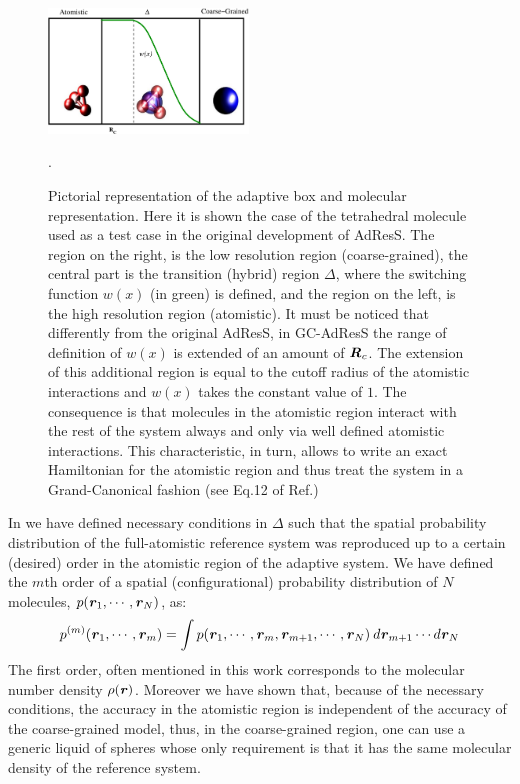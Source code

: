 \documentclass[a4paper,preprint,unsortedaddress]{revtex4-1}
\newcommand{\recheck}[1]{{\color{red} #1}}
\newcommand{\vect}[1]{\textbf{\textit{#1}}}
\begin{document}
\begin{figure}
\center
\includegraphics[width=0.475\textwidth]{adapt-schem.eps}
\caption{Pictorial representation of the adaptive box and
molecular representation. Here it is shown the case of the tetrahedral molecule used as a test case in the original development of AdResS. The region on the right,
is the low resolution region (coarse-grained), the central part is
the transition (hybrid) region $\Delta$, where the switching function
$w(x)$ (in green) is defined, and the region on the left, is the high resolution region (atomistic). It must be noticed that differently from the original AdResS, in GC-AdResS the range of definition of $w(x)$ is extended of an amount of ${\vect R}_{c}$. The extension of this additional region is equal to the cutoff radius of the atomistic interactions and $w(x)$ takes the constant value of $1$. The consequence is that molecules in the atomistic region interact with the rest of the system always and only via well defined atomistic interactions. This characteristic, in turn, allows to write an exact Hamiltonian for the atomistic region and thus treat the system in a Grand-Canonical fashion \recheck{(see Eq.12 of Ref.\cite{prx})}}.
\label{fig1}
\end{figure} 
In \cite{prx} we have defined necessary conditions in $\Delta$ such that the spatial probability distribution of the full-atomistic reference system was reproduced up to a certain (desired) order in the atomistic region of the adaptive system. \recheck{We have defined the $m$th order of a spatial (configurational) probability distribution of $N$ molecules, $p({\vect r}_{1}, \cdots, {\vect r}_{N})$, as:
\begin{equation}
p^{(m)}({\vect r}_{1}, \cdots, {\vect r}_{m})=\int p({\vect r}_{1}, \cdots, {\vect r}_{m},{\vect r}_{m+1}, \cdots, {\vect r}_{N}) \: d{\vect r}_{m+1}\cdots d{\vect r}_{N}
\label{order}
\end{equation}
The first order, often mentioned in this work corresponds to the molecular number density $\rho({\vect r})$.}
Moreover we have shown that, because of the necessary conditions, the accuracy in the atomistic region is independent of the accuracy of the coarse-grained model, thus, in the coarse-grained region, one can use a generic liquid of spheres whose only requirement is that it has the same molecular density of the reference system.
\end{document}
